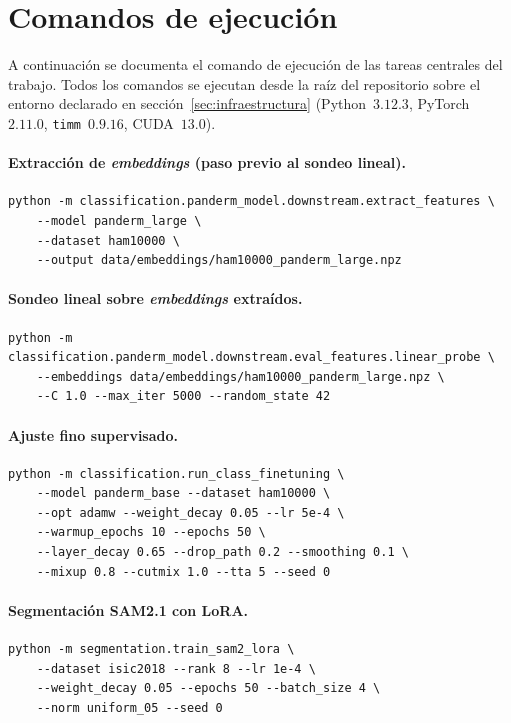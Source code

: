 \section{Comandos de ejecución}
\label{sec:anexoa-comandos}

A continuación se documenta el comando de ejecución de las
tareas centrales del trabajo. Todos los comandos se ejecutan
desde la raíz del repositorio sobre el entorno declarado en
secci\'on~\ref{sec:infraestructura} (Python~$3.12.3$, PyTorch~$2.11.0$,
\texttt{timm}~$0.9.16$, CUDA~$13.0$).

\paragraph{Extracción de \emph{embeddings} (paso previo al sondeo
lineal).}
\begin{verbatim}
python -m classification.panderm_model.downstream.extract_features \
    --model panderm_large \
    --dataset ham10000 \
    --output data/embeddings/ham10000_panderm_large.npz
\end{verbatim}

\paragraph{Sondeo lineal sobre \emph{embeddings} extraídos.}
\begin{verbatim}
python -m classification.panderm_model.downstream.eval_features.linear_probe \
    --embeddings data/embeddings/ham10000_panderm_large.npz \
    --C 1.0 --max_iter 5000 --random_state 42
\end{verbatim}

\paragraph{Ajuste fino supervisado.}
\begin{verbatim}
python -m classification.run_class_finetuning \
    --model panderm_base --dataset ham10000 \
    --opt adamw --weight_decay 0.05 --lr 5e-4 \
    --warmup_epochs 10 --epochs 50 \
    --layer_decay 0.65 --drop_path 0.2 --smoothing 0.1 \
    --mixup 0.8 --cutmix 1.0 --tta 5 --seed 0
\end{verbatim}

\paragraph{Segmentación SAM2.1 con LoRA.}
\begin{verbatim}
python -m segmentation.train_sam2_lora \
    --dataset isic2018 --rank 8 --lr 1e-4 \
    --weight_decay 0.05 --epochs 50 --batch_size 4 \
    --norm uniform_05 --seed 0
\end{verbatim}

